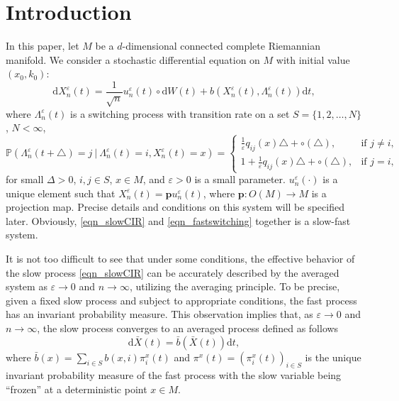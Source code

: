 \documentclass[a4paper]{article}
\numberwithin{equation}{section}
\theoremstyle{definition}
\begin{document}
\section{Introduction}\label{se1}
In this paper, let $M$ be a $d$-dimensional connected complete Riemannian manifold. We consider a stochastic differential equation on 
$M$ with initial value $(x_0,k_0)$:
\begin{equation}\label{eqn_slowCIR}   \mathrm{d}X^\varepsilon_n(t)=\frac{1}{\sqrt{n}}u^\varepsilon_n(t) \circ\mathrm{d}W(t)+b(X^\varepsilon_n(t),\Lambda^\varepsilon_n(t))\mathrm{d}t,
\end{equation}
where $\Lambda_n^\varepsilon(t)$ is a switching process with transition rate on a set $S=\{1,2,\ldots,N\}$, $N<\infty$,
\begin{equation}\label{eqn_fastswitching}
	\mathbb{P} (\Lambda^{\varepsilon}_n(t+\triangle)=j~|~\Lambda^{\varepsilon}_n(t)=i, X^{\varepsilon}_n(t)= x)=
	\begin{cases}
		\frac{1}{\varepsilon}q_{ij}(x)\triangle+ \circ(\triangle) ,&\mbox{if $j\neq i$,}\\
		1+\frac{1}{\varepsilon}q_{ij}(x)\triangle +\circ(\triangle),&\mbox{if $j=i$,}
	\end{cases}
\end{equation}
for small $\Delta >0$, $i,j \in S$, $x\in M$, and $\varepsilon>0$ is a small parameter. $u^\varepsilon_n(\cdot)$ is a unique element such that $X^\varepsilon_n(t)=\mathbf{p}u^\varepsilon_n(t)$, where $\mathbf{p}:O(M)\to M$ is a projection map. Precise details and conditions on this system will be specified later. Obviously, \eqref{eqn_slowCIR} and \eqref{eqn_fastswitching} together is a slow-fast system. 
\par
It is not too difficult to see that under some conditions, the effective behavior of the slow process 
\eqref{eqn_slowCIR} can be accurately described by the averaged system as $\varepsilon\to 0$ and $n\to \infty$, utilizing the averaging principle.
To be precise, given a fixed slow process and subject to appropriate conditions, the fast process has an invariant probability measure. This observation implies that, as $\varepsilon\to 0$ and $n\to \infty$, the slow process converges to an averaged process defined as follows
\begin{equation*}
    \mathrm{d}\bar{X}(t)=\bar{b}(\bar{X}(t))\mathrm{d}t,
\end{equation*}
where $\bar{b}(x)=\sum_{i\in S}b(x,i)\pi^x_i(t)$ and $\pi^x(t)=(\pi^x_i(t))_{i\in S}$ is the unique invariant probability measure of the fast process with the slow variable being ``frozen'' at a deterministic point $x\in M$.
\end{document}
